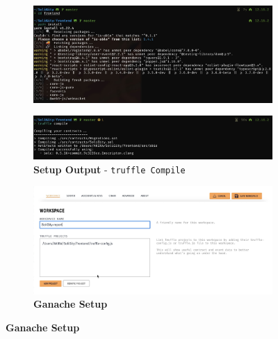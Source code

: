 \documentclass[12pt]{article}
\renewcommand{\_}{\kern-1.5pt\textunderscore\kern-1.5pt}
\begin{document}
\begin{figure}[H]
\begin{minipage}[t]{0.5\linewidth}
\begin{subfigure}[b]{\textwidth}
			\includegraphics[width=\textwidth]{graphs/04. yarn_install_frontend}
		\end{subfigure}
		\centering
		\begin{subfigure}[b]{\textwidth}
			\captionsetup{justification   = raggedright,
              singlelinecheck = false}
		\centering
				\caption*{\textbf{Setup Output} - \texttt{truffle Compile}}
		\includegraphics[width=\textwidth]{graphs/05. truffle_compile.jpg}
		\end{subfigure}
			\begin{subfigure}[b]{\textwidth}
	\captionsetup{justification   = raggedright,
              singlelinecheck = false}
		\centering
				\caption*{\textbf{Ganache Setup}}
		\includegraphics[width=\textwidth]{graphs/06. ganache_setup.jpg}
		\end{subfigure}


\end{minipage}
\end{figure}
\end{document}
